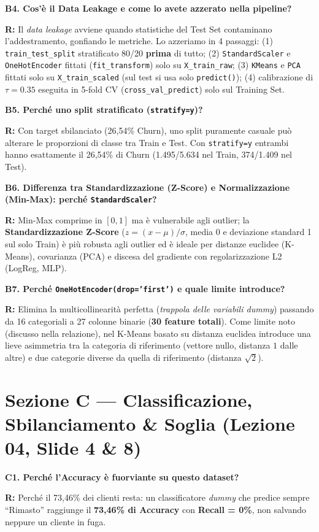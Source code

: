 \documentclass[10pt, a4paper]{article}
\newcommand{\qa}[2]{%
  \par\vspace{4pt}\noindent\textbf{\color{PrimaryNavy}#1}\par\vspace{1pt}%
  \noindent\textbf{\color{SecondaryBlue}R:} #2\par\vspace{2pt}%
}
\begin{document}
\qa{B4. Cos'è il Data Leakage e come lo avete azzerato nella pipeline?}{
Il \textit{data leakage} avviene quando statistiche del Test Set contaminano l'addestramento, gonfiando le metriche. Lo azzeriamo in 4 passaggi: (1) \texttt{train\_test\_split} stratificato 80/20 \textbf{prima} di tutto; (2) \texttt{StandardScaler} e \texttt{OneHotEncoder} fittati (\texttt{fit\_transform}) solo su \texttt{X\_train\_raw}; (3) \texttt{KMeans} e \texttt{PCA} fittati solo su \texttt{X\_train\_scaled} (sul test si usa solo \texttt{predict()}); (4) calibrazione di $\tau=0.35$ eseguita in 5-fold CV (\texttt{cross\_val\_predict}) solo sul Training Set.}

\qa{B5. Perché uno split stratificato (\texttt{stratify=y})?}{
Con target sbilanciato (26,54\% Churn), uno split puramente casuale può alterare le proporzioni di classe tra Train e Test. Con \texttt{stratify=y} entrambi hanno esattamente il 26,54\% di Churn (1.495/5.634 nel Train, 374/1.409 nel Test).}

\qa{B6. Differenza tra Standardizzazione (Z-Score) e Normalizzazione (Min-Max): perché \texttt{StandardScaler}?}{
Min-Max comprime in $[0,1]$ ma è vulnerabile agli outlier; la \textbf{Standardizzazione Z-Score} ($z=(x-\mu)/\sigma$, media 0 e deviazione standard 1 sul solo Train) è più robusta agli outlier ed è ideale per distanze euclidee (K-Means), covarianza (PCA) e discesa del gradiente con regolarizzazione L2 (LogReg, MLP).}

\qa{B7. Perché \texttt{OneHotEncoder(drop='first')} e quale limite introduce?}{
Elimina la multicollinearità perfetta (\textit{trappola delle variabili dummy}) passando da 16 categoriali a 27 colonne binarie (\textbf{30 feature totali}). Come limite noto (discusso nella relazione), nel K-Means basato su distanza euclidea introduce una lieve asimmetria tra la categoria di riferimento (vettore nullo, distanza $1$ dalle altre) e due categorie diverse da quella di riferimento (distanza $\sqrt{2}$).}

\section*{Sezione C --- Classificazione, Sbilanciamento \& Soglia (Lezione 04, Slide 4 \& 8)}

\qa{C1. Perché l'Accuracy è fuorviante su questo dataset?}{
Perché il 73,46\% dei clienti resta: un classificatore \textit{dummy} che predice sempre ``Rimasto'' raggiunge il \textbf{73,46\% di Accuracy} con \textbf{Recall = 0\%}, non salvando neppure un cliente in fuga.}
\end{document}
